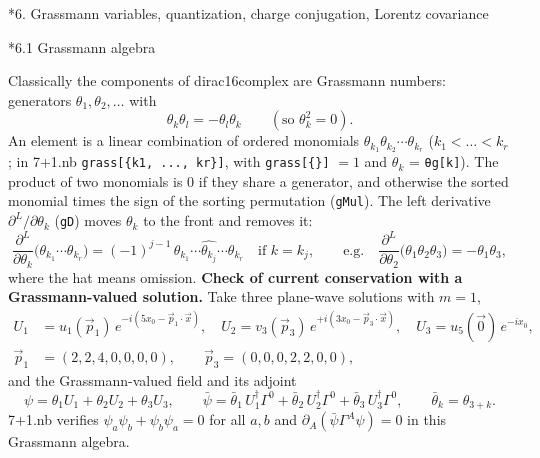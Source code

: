 \documentclass[10pt,a4paper]{article}
\makeatletter
\renewcommand\section{\@startsection{section}{1}{\z@}{-3.5ex \@plus -1ex \@minus -.2ex}{2.3ex \@plus.2ex}{\normalfont\Large\bfseries\raggedright}}
\renewcommand\subsection{\@startsection{subsection}{2}{\z@}{-3.25ex\@plus -1ex \@minus -.2ex}{1.5ex \@plus .2ex}{\normalfont\large\bfseries\raggedright}}
\makeatother
\begin{document}
\section*{6. Grassmann variables, quantization, charge conjugation, Lorentz covariance}
\subsection*{6.1 Grassmann algebra}
Classically the components of dirac16complex are Grassmann numbers: generators $\theta_1,\theta_2,\dots$ with
\begin{equation*}
\theta_k\theta_l=-\theta_l\theta_k\qquad(\text{so }\theta_k^2=0).
\end{equation*}
An element is a linear combination of ordered monomials $\theta_{k_1}\theta_{k_2}\cdots\theta_{k_r}$ ($k_1<\dots<k_r$; in 7+1.nb \texttt{grass[\{k1, ..., kr\}]}, with \texttt{grass[\{\}]} $=1$ and $\theta_k$ = \texttt{θg[k]}). The product of two monomials is $0$ if they share a generator, and otherwise the sorted monomial times the sign of the sorting permutation (\texttt{gMul}). The left derivative $\partial^{L}/\partial\theta_k$ (\texttt{gD}) moves $\theta_k$ to the front and removes it:
\begin{equation*}
\frac{\partial^{L}}{\partial\theta_k}\big(\theta_{k_1}\cdots\theta_{k_r}\big)=(-1)^{j-1}\,\theta_{k_1}\cdots\widehat{\theta_{k_j}}\cdots\theta_{k_r}\quad\text{if }k=k_j,\qquad\text{e.g.}\quad \frac{\partial^{L}}{\partial\theta_2}\big(\theta_1\theta_2\theta_3\big)=-\theta_1\theta_3 ,
\end{equation*}
where the hat means omission. \textbf{Check of current conservation with a Grassmann-valued solution.} Take three plane-wave solutions with $m=1$,
\begin{align*}
U_1&=u_1(\vec p_1)\,e^{-i(5x_0-\vec p_1\cdot\vec x)},\quad U_2=v_3(\vec p_3)\,e^{+i(3x_0-\vec p_3\cdot\vec x)},\quad U_3=u_5(\vec 0)\,e^{-ix_0}, \\
\vec p_1&=(2,2,4,0,0,0,0),\qquad \vec p_3=(0,0,0,2,2,0,0),
\end{align*}
and the Grassmann-valued field and its adjoint
\begin{equation*}
\psi=\theta_1U_1+\theta_2U_2+\theta_3U_3,\qquad \bar\psi=\bar\theta_1\,U_1^\dagger\Gamma^0+\bar\theta_2\,U_2^\dagger\Gamma^0+\bar\theta_3\,U_3^\dagger\Gamma^0,\qquad \bar\theta_k=\theta_{3+k}.
\end{equation*}
7+1.nb verifies $\psi_a\psi_b+\psi_b\psi_a=0$ for all $a,b$ and $\partial_A(\bar\psi\Gamma^A\psi)=0$ in this Grassmann algebra.
\end{document}

